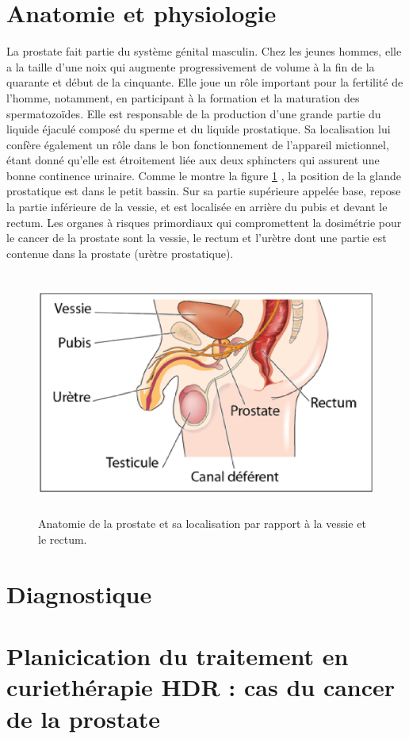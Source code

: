 \section{Anatomie et physiologie}
La prostate fait partie du système génital masculin. Chez les jeunes hommes, elle a la taille d’une noix qui augmente progressivement de volume à la fin de la quarante et début de la cinquante. Elle joue un rôle important pour la fertilité de l’homme, notamment, en participant à la formation et la maturation des spermatozoïdes. Elle est responsable de la production d’une grande partie du liquide éjaculé composé du sperme et du liquide prostatique. Sa localisation lui confère également un rôle dans le bon fonctionnement de l'appareil mictionnel, étant donné qu’elle est étroitement liée aux deux sphincters qui assurent une bonne continence urinaire. Comme le montre la figure \ref{FigureProstate} \cite{ImageProstate}, la position de la glande prostatique est dans le petit bassin. Sur sa partie supérieure appelée base, repose la partie inférieure de la vessie, et est localisée en arrière du pubis et devant le rectum. Les organes à risques primordiaux qui compromettent la dosimétrie pour le cancer de la prostate sont la vessie, le rectum et l’urètre dont une partie est contenue dans la prostate (urètre prostatique).
%
\begin{figure}[h]
\centering
\includegraphics[width=12.0cm,height=8.0cm]{FigureProstate.eps}
\caption{\label{FigureProstate} Anatomie de la prostate et sa localisation par rapport à la vessie et le rectum.}
\end{figure}
\section{Diagnostique}
%
\section{Planicication du traitement en curiethérapie HDR : cas du cancer de la prostate}
%
